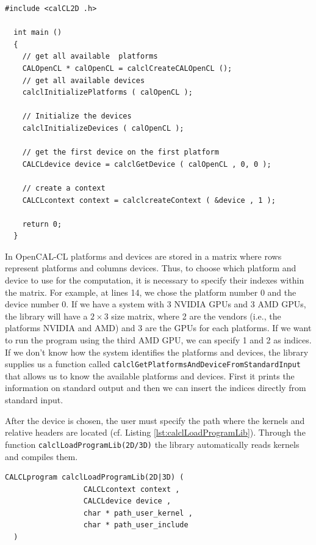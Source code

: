 \begin{lstlisting}[float,floatplacement=H, label=lst:CALOpenCL, caption=Access to platform and devices.]
  #include <calCL2D .h>

  int main ()
  {
    // get all available  platforms
    CALOpenCL * calOpenCL = calclCreateCALOpenCL ();
    // get all available devices
    calclInitializePlatforms ( calOpenCL );

    // Initialize the devices
    calclInitializeDevices ( calOpenCL );

    // get the first device on the first platform
    CALCLdevice device = calclGetDevice ( calOpenCL , 0, 0 );

    // create a context
    CALCLcontext context = calclcreateContext ( &device , 1 );

    return 0;
  }
\end{lstlisting}

In OpenCAL-CL platforms and devices are stored in a matrix where rows
represent platforms and columns devices. Thus, to choose which
platform and device to use for the computation, it is necessary to
specify their indexes within the matrix. For example, at lines 14, we
chose the platform number 0 and the device number 0. If we have a
system with 3 NVIDIA GPUs and 3 AMD GPUs, the library will have a $2
\times 3$ size matrix, where 2 are the vendors (i.e., the platforms
NVIDIA and AMD) and 3 are the GPUs for each platforms. If we want to
run the program using the third AMD GPU, we can specify 1 and 2 as
indices. If we don't know how the system identifies the platforms and
devices, the library supplies us a function called
\verb'calclGetPlatformsAndDeviceFromStandardInput' that allows us to
know the available platforms and devices. First it prints the
information on standard output and then we can insert the indices
directly from standard input.

After the device is chosen, the user must specify the path where the
kernels and relative headers are located (cf. Listing
\ref{lst:calclLoadProgramLib}). Through the function
\verb'calclLoadProgramLib(2D/3D)' the library automatically reads
kernels and compiles them.

\begin{lstlisting}[float,floatplacement=H, label=lst:calclLoadProgramLib, caption=The calclLoadProgramLib function., numbers=none]
  CALCLprogram calclLoadProgramLib(2D|3D) (
                  CALCLcontext context ,
                  CALCLdevice device ,
                  char * path_user_kernel ,
                  char * path_user_include
  )
\end{lstlisting}

